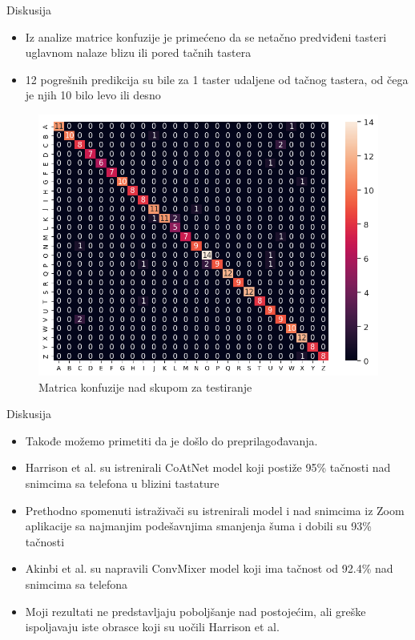 \documentclass{beamer}
\begin{document}
\begin{frame}{Diskusija}
    \begin{itemize}
        \item Iz analize matrice konfuzije je primećeno da se netačno predviđeni tasteri uglavnom nalaze blizu ili pored tačnih tastera
        \item 12 pogrešnih predikcija su bile za 1 taster udaljene od tačnog tastera, od čega je njih 10 bilo levo ili desno
    \end{itemize}
    \begin{figure}
        \centering
        \includegraphics[scale=0.28]{ConfusionMatrix.png}
        \centering
        \captionsetup{justification=centering}
        \caption{Matrica konfuzije nad skupom za testiranje}
        \label{fig:my_label}
    \end{figure}
\end{frame}

\begin{frame}{Diskusija}
    \begin{itemize}
        \item Takođe možemo primetiti da je došlo do preprilagođavanja.
        \item Harrison et al. su istrenirali CoAtNet model koji postiže 95\% tačnosti nad snimcima sa telefona u blizini tastature
        \item Prethodno spomenuti istraživači su istrenirali model i nad snimcima iz Zoom aplikacije sa najmanjim podešavnjima smanjenja šuma i dobili su 93\% tačnosti
        \item Akinbi et al. su napravili ConvMixer model koji ima tačnost od 92.4\% nad snimcima sa telefona
        \item Moji rezultati ne predstavljaju poboljšanje nad postojećim, ali greške ispoljavaju iste obrasce koji su uočili Harrison et al.
    \end{itemize}
\end{frame}
\end{document}
